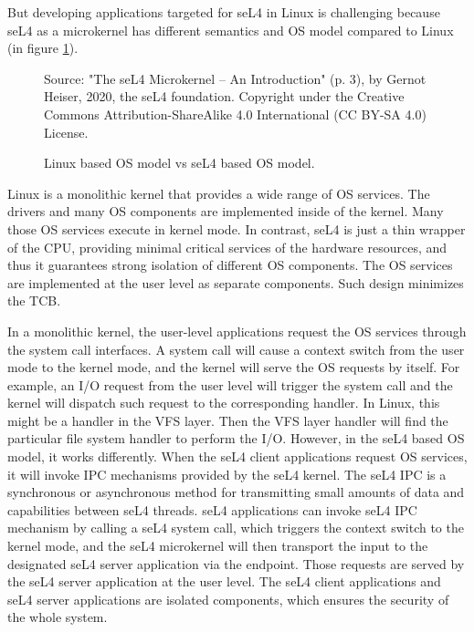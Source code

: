 But developing applications targeted for seL4 in Linux is challenging because seL4 as a microkernel has different semantics and OS model compared to Linux (in figure \ref{fig:osmodel}).

\begin{figure}[h] %
    \centering
    {Source: "The seL4 Microkernel – An Introduction" (p. 3), by Gernot Heiser, 2020, the seL4 foundation. Copyright  under the Creative Commons Attribution-ShareAlike 4.0 International (CC BY-SA 4.0) License.}
    
    \caption{Linux based OS model vs seL4 based OS model.}
    \label{fig:osmodel}
\end{figure}

Linux is a monolithic kernel that provides a wide range of OS services. The drivers and many OS components are implemented inside of the kernel. Many those OS services execute in kernel mode. In contrast, seL4 is just a thin wrapper of the CPU, providing minimal critical services of the hardware resources, and thus it guarantees strong isolation of different OS components. The OS services are implemented at the user level as separate components. Such design minimizes the TCB. 

In a monolithic kernel, the user-level applications request the OS services through the system call interfaces. A system call will cause a context switch from the user mode to the kernel mode, and the kernel will serve the OS requests by itself. For example, an I/O request from the user level will trigger the system call and the kernel will dispatch such request to the corresponding handler. In Linux, this might be a handler in the VFS layer. Then the VFS layer handler will find the particular file system handler to perform the I/O. However, in the seL4 based OS model, it works differently. When the seL4 client applications request OS services, it will invoke IPC mechanisms provided by the seL4 kernel. The seL4 IPC is a synchronous or asynchronous method for transmitting small amounts of data and capabilities between seL4 threads. seL4 applications can invoke seL4 IPC mechanism by calling a seL4 system call, which triggers the context switch to the kernel mode, and the seL4 microkernel will then transport the input to the designated seL4 server application via the endpoint. Those requests are served by the seL4 server application at the user level. The seL4 client applications and seL4 server applications are isolated components, which ensures the security of the whole system.

